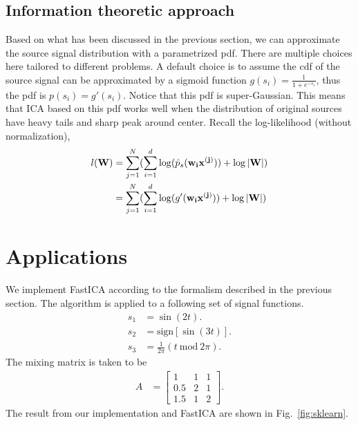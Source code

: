 \documentclass[aps,prl,preprint,superscriptaddress]{revtex4-2}
\begin{document}
\subsection{Information theoretic approach}
Based on what has been discussed in the previous section, we can approximate the source signal distribution with a parametrized pdf. There are multiple choices here tailored to different problems. A default choice is to assume the cdf of the source signal can be approximated by a sigmoid function $g(s_{i}) = \frac{1}{1+e^{-s_{s}}}$, thus the pdf is $p(s_{i}) = g'(s_{i})$. Notice that this pdf is super-Gaussian. This means that ICA based on this pdf works well when the distribution of original sources have heavy tails and sharp peak around center. Recall the log-likelihood (without normalization), 
\begin{align}
l(\bf{W}) &= \sum_{j=1}^{N}(\sum_{i=1}^{d}\log(\hat{p}_{s}(\bf{w}_{i}\bf{x}^{(j)}))+\log|\bf{W}|) \\
&= \sum_{j=1}^{N}(\sum_{i=1}^{d}\log(g'(\bf{w}_{i}\bf{x}^{(j)}))+\log|\bf{W}|)
\end{align}    
\section{Applications}
We implement FastICA according to the formalism described in the previous section.
The algorithm is applied to a following set of signal functions.
\begin{align}
s_1 &= \sin(2 t). \\
s_2 &= \mathrm{sign} [\sin(3 t)]. \\
s_3 &= \frac{1}{2\pi} (t~\mathrm{mod}~2\pi).
\end{align}
The mixing matrix is taken to be
\begin{align}
A &= \begin{bmatrix}
1 & 1 & 1 \\
0.5 & 2 & 1 \\
1.5 & 1 & 2
\end{bmatrix}.
\end{align}
The result from our implementation and FastICA are shown in Fig.~\ref{fig:sklearn}.


\end{document}
